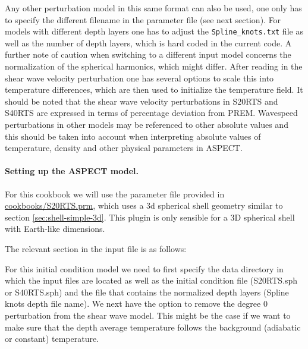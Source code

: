 \documentclass{article}
\newcommand{\aspect}{\textsc{ASPECT}}
\begin{document}
Any other perturbation model in this same format can also be used, one only
has to specify the different filename in the parameter file (see next section).
For models with different depth layers one has to adjust the \texttt{Spline\_knots.txt}
file as well as the number of depth layers, which is hard coded in the current
code. A further note of caution when switching to a different input model
concerns the normalization of the spherical harmonics, which might differ.
After reading in the shear wave velocity perturbation one has several options
to scale this into temperature differences, which are then used to initialize
the temperature field. It should be noted that the shear wave velocity perturbations in
S20RTS and S40RTS are expressed in terms of percentage deviation from PREM. Wavespeed perturbations
in other models may be referenced to other absolute values and this should be taken into account
when interpreting absolute values of temperature, density and other physical parameters in ASPECT.

\paragraph{Setting up the \aspect{} model.}

For this cookbook we will use the parameter file provided in
\url{cookbooks/S20RTS.prm}, which uses a 3d spherical shell
geometry similar to section \ref{sec:shell-simple-3d}. This plugin is only sensible
for a 3D spherical shell with Earth-like dimensions.

The relevant section in the input file is as follows:



For this initial condition model we need to first specify the data directory in which
the input files are located as well as the initial condition file (S20RTS.sph or
S40RTS.sph) and the file that contains the normalized depth layers (Spline knots depth file name).
We next have the option to remove the degree 0 perturbation from the shear
wave model. This might be the case if we want to make sure that the depth
average temperature follows the background (adiabatic or constant) temperature.
\end{document}

